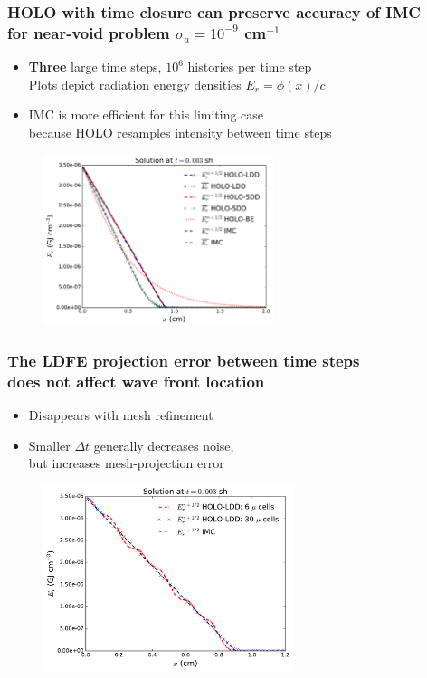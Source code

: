 \documentclass[xcolor=dvipsnames,hyperref={pdfpagelabels=false},unknownkeysallowed]{beamer}
\newcommand{\colG}[1]{{\color{Gray!110} #1}}
\newlength{\wideitemsep}
\let\olditem\item
\renewcommand{\item}{\setlength{\itemsep}{\wideitemsep}\olditem}
\begin{document}
\begin{frame}
    \frametitle{HOLO with time closure can preserve accuracy of IMC \\ for near-void problem $\sigma_a=10^{-9}$ cm$^{-1}$}
    \begin{itemize}
    \vspace{0.1in}
        \item[] \textbf{Three} large time steps, $10^6$ histories per time step \\ \colG{Plots depict radiation energy densities $E_r=\phi(x)/c$}
        \item[] IMC is more efficient for this limiting case \\ \colG{because HOLO resamples intensity between time steps}
    \end{itemize}
        \begin{figure}
\centering
    \includegraphics[width=0.6\textwidth]{void_imc_compare.pdf}
\end{figure}
\end{frame}

\begin{frame}
    \frametitle{The LDFE projection error between time steps \\ does not affect wave front location}
        \begin{itemize}
        \item Disappears with mesh refinement 
        \item Smaller $\Delta t$ generally decreases noise, \\ but increases mesh-projection error
        \end{itemize}
\begin{figure}[H]
  \centering
    \includegraphics[width=0.65\textwidth]{void_ang_compare.pdf}
\end{figure}
\end{frame}
\end{document}
